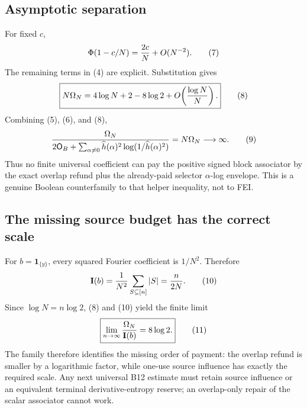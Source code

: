 \subsection*{Asymptotic separation}

For fixed $c$,
\[
 \Phi(1-c/N)={2c\over N}+O(N^{-2}).
\tag{7}
\]
The remaining terms in (4) are explicit.  Substitution gives
\[
 \boxed{N\Omega_N=4\log N+2-8\log2
       +O\!\left({\log N\over N}\right).}
\tag{8}
\]
Combining (5), (6), and (8),
\[
 {\Omega_N\over
  2\mathsf O_B+
  \sum_{\alpha\ne0}\widehat h(\alpha)^2
       \log(1/\widehat h(\alpha)^2)}
 =N\Omega_N\longrightarrow\infty.
\tag{9}
\]
Thus no finite universal coefficient can pay the positive signed block
associator by the exact overlap refund plus the already-paid selector
$\alpha$-log envelope.  This is a genuine Boolean counterfamily to that
helper inequality, not to FEI.

\subsection*{The missing source budget has the correct scale}

For $b=\mathbf1_{\{y\}}$, every squared Fourier coefficient is $1/N^2$.
Therefore
\[
 \mathbf I(b)={1\over N^2}\sum_{S\subseteq[n]}|S|
              ={n\over2N}.
\tag{10}
\]
Since $\log N=n\log2$, (8) and (10) yield the finite limit
\[
 \boxed{\lim_{n\to\infty}{\Omega_N\over\mathbf I(b)}=8\log2.}
\tag{11}
\]
The family therefore identifies the missing order of payment: the overlap
refund is smaller by a logarithmic factor, while one-use source influence
has exactly the required scale.  Any next universal B12 estimate must retain
source influence or an equivalent terminal derivative-entropy reserve; an
overlap-only repair of the scalar associator cannot work.

